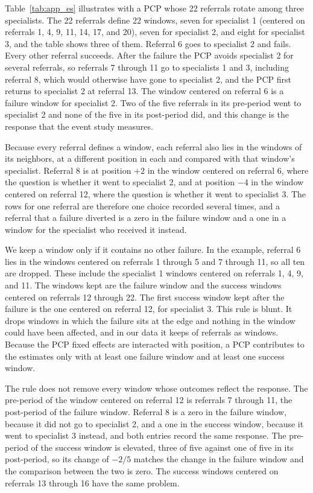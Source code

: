 \documentclass[12pt]{article}
\begin{document}
Table~\ref{tab:app_es} illustrates with a PCP whose 22 referrals rotate among three specialists. The 22 referrals define 22 windows, seven for specialist 1 (centered on referrals 1, 4, 9, 11, 14, 17, and 20), seven for specialist 2, and eight for specialist 3, and the table shows three of them. Referral 6 goes to specialist 2 and fails. Every other referral succeeds. After the failure the PCP avoids specialist 2 for several referrals, so referrals 7 through 11 go to specialists 1 and 3, including referral 8, which would otherwise have gone to specialist 2, and the PCP first returns to specialist 2 at referral 13. The window centered on referral 6 is a failure window for specialist 2. Two of the five referrals in its pre-period went to specialist 2 and none of the five in its post-period did, and this change is the response that the event study measures.

Because every referral defines a window, each referral also lies in the windows of its neighbors, at a different position in each and compared with that window's specialist. Referral 8 is at position $+2$ in the window centered on referral 6, where the question is whether it went to specialist 2, and at position $-4$ in the window centered on referral 12, where the question is whether it went to specialist 3. The rows for one referral are therefore one choice recorded several times, and a referral that a failure diverted is a zero in the failure window and a one in a window for the specialist who received it instead.

We keep a window only if it contains no other failure. In the example, referral 6 lies in the windows centered on referrals 1 through 5 and 7 through 11, so all ten are dropped. These include the specialist 1 windows centered on referrals 1, 4, 9, and 11. The windows kept are the failure window and the success windows centered on referrals 12 through 22. The first success window kept after the failure is the one centered on referral 12, for specialist 3. This rule is blunt. It drops windows in which the failure sits at the edge and nothing in the window could have been affected, and in our data it keeps \rereferESEvents{} of \rereferEvents{} referrals as windows. Because the PCP fixed effects are interacted with position, a PCP contributes to the estimates only with at least one failure window and at least one success window.

The rule does not remove every window whose outcomes reflect the response. The pre-period of the window centered on referral 12 is referrals 7 through 11, the post-period of the failure window. Referral 8 is a zero in the failure window, because it did not go to specialist 2, and a one in the success window, because it went to specialist 3 instead, and both entries record the same response. The pre-period of the success window is elevated, three of five against one of five in its post-period, so its change of $-2/5$ matches the change in the failure window and the comparison between the two is zero. The success windows centered on referrals 13 through 16 have the same problem.
\end{document}
